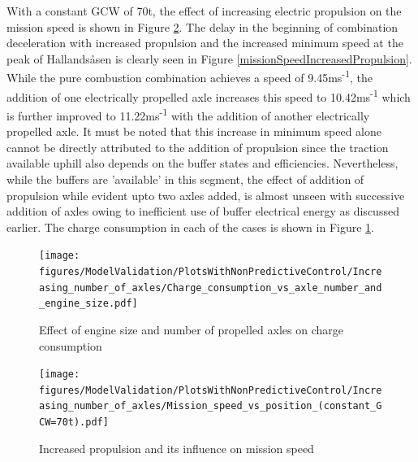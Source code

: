 \documentclass[ExampleMasters.tex]{subfiles}
\begin{document}
With a constant GCW of 70t, the effect of increasing electric propulsion on the mission speed is shown in Figure \ref{globalMissionSpeedIncreasedPropulsion}. The delay in the beginning of combination deceleration with increased propulsion and the increased minimum speed at the peak of Hallands\aa sen is clearly seen in Figure \ref{missionSpeedIncreasedPropulsion}. While the pure combustion combination achieves a speed of 9.45ms\textsuperscript{-1}, the addition of one electrically propelled axle increases this speed to 10.42ms\textsuperscript{-1} which is further improved to 11.22ms\textsuperscript{-1} with the addition of another electrically propelled axle. It must be noted that this increase in minimum speed alone cannot be directly attributed to the addition of propulsion since the traction available uphill also depends on the buffer states and efficiencies. Nevertheless, while the buffers are 'available' in this segment, the effect of addition of propulsion while evident upto two axles added, is almost unseen with successive addition of axles owing to inefficient use of buffer electrical energy as discussed earlier. The charge consumption in each of the cases is shown in Figure \ref{chargeEngineSizeNumberOfAxles}.\\
\begin{figure}
\centering
\texttt{[image: figures/ModelValidation/PlotsWithNonPredictiveControl/Increasing\_number\_of\_axles/Charge\_consumption\_vs\_axle\_number\_and\_engine\_size.pdf]}
\caption{Effect of engine size and number of propelled axles on charge consumption}
\label{chargeEngineSizeNumberOfAxles}
\end{figure}
\begin{figure}
\centering
\texttt{[image: figures/ModelValidation/PlotsWithNonPredictiveControl/Increasing\_number\_of\_axles/Mission\_speed\_vs\_position\_(constant\_GCW=70t).pdf]}
\caption{Increased propulsion and its influence on mission speed}
\label{globalMissionSpeedIncreasedPropulsion}
\end{figure}
\end{document}
